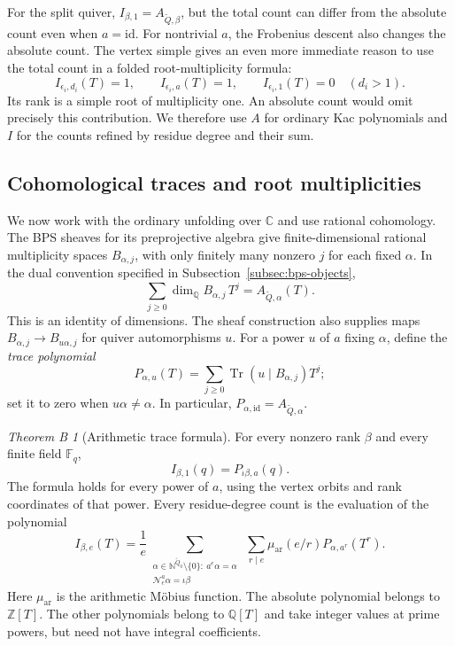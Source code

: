 \documentclass[11pt, reqno]{amsart}
\numberwithin{equation}{section}
\theoremstyle{definition}
\theoremstyle{remark}
\newtheorem*{theoremB}{Theorem B}
\newcommand{\op}[1]{\operatorname{#1}}
\newcommand{\mr}[1]{\mathrm{#1}}
\newcommand{\mb}[1]{\mathbb{#1}}
\newcommand{\mc}[1]{\mathcal{#1}}
\newcommand{\Tr}{\op{Tr}}
\newcommand{\Qbar}{\widetilde Q}
\begin{document}
For the split quiver, $I_{\beta,1}=A_{\Qbar,\beta}$, but the total
count can differ from the absolute count even when $a=\mr{id}$.
For nontrivial $a$, the Frobenius descent also changes the absolute count.
The vertex simple gives an even more immediate reason to use the total
count in a folded root-multiplicity formula:
\[ I_{\epsilon_i,d_i}(T)=1,\qquad I_{\epsilon_i,a}(T)=1,\qquad I_{\epsilon_i,1}(T)=0\quad(d_i>1). \]
Its rank is a simple root of multiplicity one. An absolute count would
omit precisely this contribution. We therefore use $A$ for ordinary
Kac polynomials and $I$ for the counts refined by residue degree and
their sum.

\subsection*{Cohomological traces and root multiplicities}
We now work with the ordinary unfolding over $\mb C$ and use
rational cohomology. The BPS sheaves for its preprojective algebra give
finite-dimensional rational multiplicity spaces $B_{\alpha,j}$,
with only finitely many nonzero $j$ for each fixed $\alpha$. In the dual convention specified in
Subsection~\ref{subsec:bps-objects},
\[ \sum_{j\ge0}\dim_{\mb Q}B_{\alpha,j}\,T^j=A_{\Qbar,\alpha}(T). \]
This is an identity of dimensions. The sheaf construction also supplies
maps $B_{\alpha,j}\to B_{u\alpha,j}$ for quiver automorphisms $u$.
For a power $u$ of $a$ fixing $\alpha$, define the \emph{trace polynomial}
\[ P_{\alpha,u}(T)=\sum_{j\ge0}\Tr(u\mid B_{\alpha,j})T^j; \]
set it to zero when $u\alpha\ne\alpha$. In particular,
$P_{\alpha,\mr{id}}=A_{\Qbar,\alpha}$.

\begin{theoremB}[Arithmetic trace formula]
For every nonzero rank $\beta$ and every finite field $\mb F_q$,
\[ I_{\beta,1}(q)=P_{\iota\beta,a}(q). \]
The formula holds for every power of $a$, using the vertex orbits and
rank coordinates of that power. Every residue-degree count is the
evaluation of the polynomial
\[ I_{\beta,e}(T)=\frac1e\sum_{\substack{\alpha\in\mb N^{\Qbar_0}\setminus\{0\}:\ a^e\alpha=\alpha\\\mc N_e^a\alpha=\iota\beta}}\ \sum_{r\mid e}\mu_{\mr{ar}}(e/r)P_{\alpha,a^r}(T^r). \]
Here $\mu_{\mr{ar}}$ is the arithmetic M\"obius function. The
absolute polynomial belongs to $\mb Z[T]$. The other polynomials
belong to $\mb Q[T]$ and take integer values at prime powers, but
need not have integral coefficients.
\end{theoremB}
\end{document}
